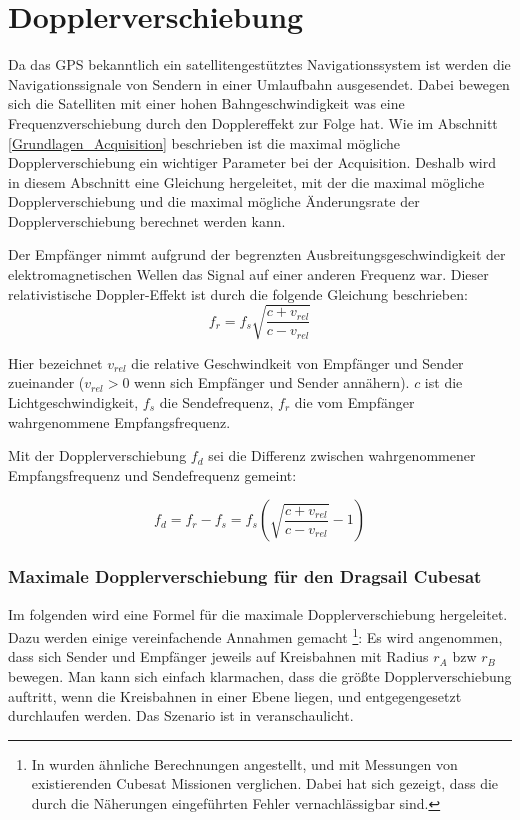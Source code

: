 \section{Dopplerverschiebung}
\label{Dopplereffekt}
Da das GPS bekanntlich ein satellitengestütztes Navigationssystem ist werden die Navigationssignale von Sendern in einer Umlaufbahn ausgesendet. Dabei bewegen sich die Satelliten mit einer hohen Bahngeschwindigkeit was eine Frequenzverschiebung durch den Dopplereffekt zur Folge hat. Wie im Abschnitt \ref{Grundlagen_Acquisition} beschrieben ist die maximal mögliche Dopplerverschiebung ein wichtiger Parameter bei der Acquisition. Deshalb wird in diesem Abschnitt eine Gleichung hergeleitet, mit der die maximal mögliche Dopplerverschiebung und die maximal mögliche Änderungsrate der Dopplerverschiebung berechnet werden kann.

Der Empfänger nimmt aufgrund der begrenzten Ausbreitungsgeschwindigkeit der elektromagnetischen Wellen das Signal auf einer anderen Frequenz war. Dieser relativistische Doppler-Effekt ist durch die folgende Gleichung beschrieben:
\begin{equation}
    f_r=f_s \sqrt{\frac{c+v_{rel}}{c-v_{rel}}}
\end{equation}

Hier bezeichnet $v_{rel}$ die relative Geschwindkeit von Empfänger und Sender zueinander ($v_{rel}>0$ wenn sich Empfänger und Sender annähern). $c$ ist die Lichtgeschwindigkeit, $f_s$ die Sendefrequenz, $f_r$ die vom Empfänger wahrgenommene Empfangsfrequenz.

Mit der Dopplerverschiebung $f_d$ sei die Differenz zwischen wahrgenommener Empfangsfrequenz und Sendefrequenz gemeint:

\begin{equation}
\label{EqDoppler}
    f_d=f_r-f_s=f_s \left( \sqrt{\frac{c+v_{rel}}{c-v_{rel}}}-1 \right)
\end{equation}

\subsubsection{Maximale Dopplerverschiebung für den Dragsail Cubesat}
Im folgenden wird eine Formel für die  maximale Dopplerverschiebung hergeleitet. 
Dazu werden einige vereinfachende Annahmen gemacht \footnote{In \cite{Birklykke2010} wurden ähnliche Berechnungen angestellt, und mit Messungen von existierenden Cubesat Missionen verglichen. Dabei hat sich gezeigt, dass die durch die Näherungen eingeführten Fehler vernachlässigbar sind.}: Es wird angenommen, dass sich Sender und Empfänger jeweils auf Kreisbahnen mit Radius $r_A$ bzw $r_B$ bewegen. Man kann sich einfach klarmachen, dass die größte Dopplerverschiebung auftritt, wenn die Kreisbahnen in einer Ebene liegen, und entgegengesetzt durchlaufen werden. Das Szenario ist in  veranschaulicht.

